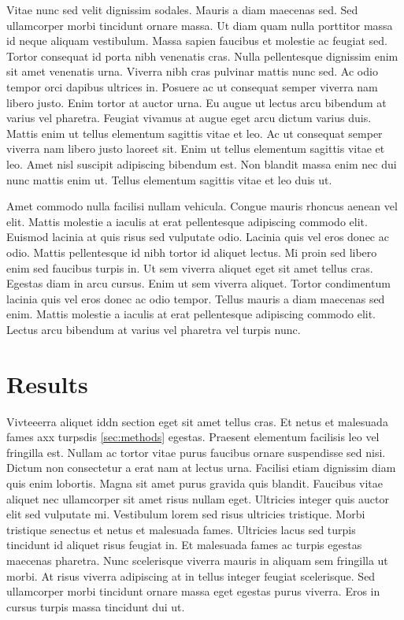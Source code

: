 Vitae nunc sed velit dignissim sodales. Mauris a diam maecenas sed. Sed
ullamcorper morbi tincidunt ornare massa. Ut diam quam nulla porttitor
massa id neque aliquam vestibulum. Massa sapien faucibus et molestie ac
feugiat sed. Tortor consequat id porta nibh venenatis cras. Nulla
pellentesque dignissim enim sit amet venenatis urna. Viverra nibh cras
pulvinar mattis nunc sed. Ac odio tempor orci dapibus ultrices in.
Posuere ac ut consequat semper viverra nam libero justo. Enim tortor at
auctor urna. Eu augue ut lectus arcu bibendum at varius vel pharetra.
Feugiat vivamus at augue eget arcu dictum varius duis. Mattis enim ut
tellus elementum sagittis vitae et leo. Ac ut consequat semper viverra
nam libero justo laoreet sit. Enim ut tellus elementum sagittis vitae et
leo. Amet nisl suscipit adipiscing bibendum est. Non blandit massa enim
nec dui nunc mattis enim ut. Tellus elementum sagittis vitae et leo duis
ut.

Amet commodo nulla facilisi nullam vehicula. Congue mauris rhoncus
aenean vel elit. Mattis molestie a iaculis at erat pellentesque
adipiscing commodo elit. Euismod lacinia at quis risus sed vulputate
odio. Lacinia quis vel eros donec ac odio. Mattis pellentesque id nibh
tortor id aliquet lectus. Mi proin sed libero enim sed faucibus turpis
in. Ut sem viverra aliquet eget sit amet tellus cras. Egestas diam in
arcu cursus. Enim ut sem viverra aliquet. Tortor condimentum lacinia
quis vel eros donec ac odio tempor. Tellus mauris a diam maecenas sed
enim. Mattis molestie a iaculis at erat pellentesque adipiscing commodo
elit. Lectus arcu bibendum at varius vel pharetra vel turpis nunc.

\hypertarget{results}{%
\section{Results}\label{results}}

Vivteeerra aliquet iddn section eget sit amet tellus cras. Et netus et
malesuada fames axx turpsdis \ref{sec:methods} egestas. Praesent
elementum facilisis leo vel fringilla est. Nullam ac tortor vitae purus
faucibus ornare suspendisse sed nisi. Dictum non consectetur a erat nam
at lectus urna. Facilisi etiam dignissim diam quis enim lobortis. Magna
sit amet purus gravida quis blandit. Faucibus vitae aliquet nec
ullamcorper sit amet risus nullam eget. Ultricies integer quis auctor
elit sed vulputate mi. Vestibulum lorem sed risus ultricies tristique.
Morbi tristique senectus et netus et malesuada fames. Ultricies lacus
sed turpis tincidunt id aliquet risus feugiat in. Et malesuada fames ac
turpis egestas maecenas pharetra. Nunc scelerisque viverra mauris in
aliquam sem fringilla ut morbi. At risus viverra adipiscing at in tellus
integer feugiat scelerisque. Sed ullamcorper morbi tincidunt ornare
massa eget egestas purus viverra. Eros in cursus turpis massa tincidunt
dui ut.

